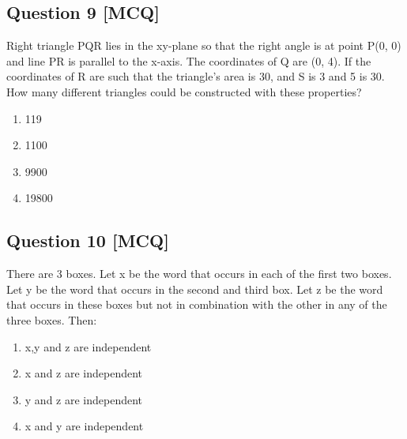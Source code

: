 \documentclass[12pt,a4paper]{article}
\begin{document}
\begin{center}
\end{center}




\subsection*{Question 9 [MCQ]}
Right triangle PQR lies in the xy-plane so that the right angle is at point P(0, 0) and line PR is parallel to the x-axis. The coordinates of Q are (0, 4). If the coordinates of R are such that the triangle’s area is 30, and S is 3 and 5 is 30. How many different triangles could be constructed with these properties?

\begin{enumerate}[label=(\alph*)]
\item 119
\item 1100  
\item 9900
\item 19800
\end{enumerate}


\subsection*{Question 10 [MCQ]}
There are 3 boxes. Let x be the word that occurs in each of the first two boxes. Let y be the word that occurs in the second and third box. Let z be the word that occurs in these boxes but not in combination with the other in any of the three boxes. Then:
\begin{enumerate}[label=(\alph*)]
\item x,y and z are independent
\item  x and z are independent
\item y and z are independent
\item x and y are independent
\end{enumerate}
\end{document}
